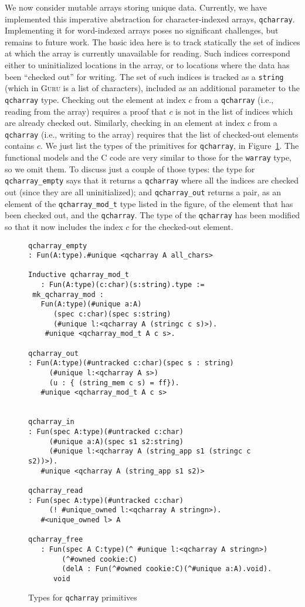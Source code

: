 \documentclass[9pt,natbib]{sigplanconf}
\begin{document}
We now consider mutable arrays storing unique data.  Currently, we
have implemented this imperative abstraction for character-indexed
arrays, \texttt{qcharray}.  Implementing it for word-indexed arrays
poses no significant challenges, but remains to future work.  The
basic idea here is to track statically the set of indices at which the
array is currently unavailable for reading.  Such indices correspond
either to uninitialized locations in the array, or to locations where
the data has been ``checked out'' for writing.  The set of such
indices is tracked as a \texttt{string} (which in \textsc{Guru} is a
list of characters), included as an additional parameter to the
\texttt{qcharray} type. Checking out the element at index $c$ from a
\texttt{qcharray} (i.e., reading from the array) requires a proof that
$c$ is not in the list of indices which are already checked out.
Similarly, checking in an element at index $c$ from a
\texttt{qcharray} (i.e., writing to the array) requires that the list
of checked-out elements contains $c$.  We just list the types of the
primitives for \texttt{qcharray}, in Figure~\ref{fig:qcharray}.  The
functional models and the C code are very similar to those for the
\texttt{warray} type, so we omit them.  To discuss just a couple of
those types: the type for \texttt{qcharray\_empty} says that it
returns a \texttt{qcharray} where all the indices are checked out
(since they are all uninitialized); and \texttt{qcharray\_out} returns
a pair, as an element of the \texttt{qcharray\_mod\_t} type listed in
the figure, of the element that has been checked out, and the
\texttt{qcharray}.  The type of the \texttt{qcharray} has been
modified so that it now includes the index $c$ for the checked-out
element.

\begin{figure}
\small
\begin{verbatim}
qcharray_empty 
: Fun(A:type).#unique <qcharray A all_chars>

Inductive qcharray_mod_t
   : Fun(A:type)(c:char)(s:string).type :=
 mk_qcharray_mod : 
   Fun(A:type)(#unique a:A)
      (spec c:char)(spec s:string)
      (#unique l:<qcharray A (stringc c s)>).
    #unique <qcharray_mod_t A c s>.

qcharray_out 
: Fun(A:type)(#untracked c:char)(spec s : string)
     (#unique l:<qcharray A s>)
     (u : { (string_mem c s) = ff}).
   #unique <qcharray_mod_t A c s>


qcharray_in
: Fun(spec A:type)(#untracked c:char)
     (#unique a:A)(spec s1 s2:string)
     (#unique l:<qcharray A (string_app s1 (stringc c s2))>). 
   #unique <qcharray A (string_app s1 s2)>

qcharray_read
: Fun(spec A:type)(#untracked c:char)
     (! #unique_owned l:<qcharray A stringn>). 
   #<unique_owned l> A 

qcharray_free
   : Fun(spec A C:type)(^ #unique l:<qcharray A stringn>)
        (^#owned cookie:C)
        (delA : Fun(^#owned cookie:C)(^#unique a:A).void).
      void 
\end{verbatim}
\label{fig:qcharray}
\caption{Types for \texttt{qcharray} primitives}
\end{figure}
\end{document}
